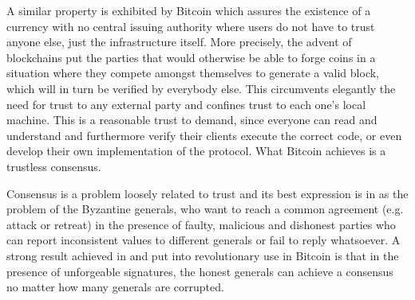   A similar property is exhibited by Bitcoin \cite{bitcoin} which assures the existence of a currency with no central
  issuing authority where users do not have to trust anyone else, just the infrastructure itself. More precisely, the advent
  of blockchains put the parties that would otherwise be able to forge coins in a situation where they compete amongst
  themselves to generate a valid block, which will in turn be verified by everybody else. This circumvents elegantly the need
  for trust to any external party and confines trust to each one's local machine. This is a reasonable trust to demand, since
  everyone can read and understand \cite{bitcoin} and furthermore verify their clients execute the correct code, or even
  develop their own implementation of the protocol. What Bitcoin achieves is a trustless consensus.

  Consensus is a problem loosely related to trust and its best expression is in \cite{byzantine} as the problem of the
  Byzantine generals, who want to reach a common agreement (e.g. attack or retreat) in the presence of faulty, malicious and
  dishonest parties who can report inconsistent values to different generals or fail to reply whatsoever. A strong result
  achieved in \cite{byzantine} and put into revolutionary use in Bitcoin is that in the presence of unforgeable signatures,
  the honest generals can achieve a consensus no matter how many generals are corrupted.
